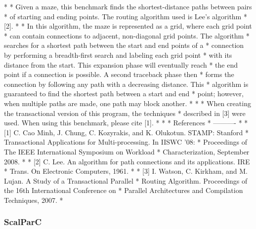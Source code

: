 \documentclass{article}
\begin{document}
*
* Given a maze, this benchmark finds the shortest-distance paths between pairs 
* of starting and ending points. The routing algorithm used is Lee's algorithm 
* [2].
* 
* In this algorithm, the maze is represented as a grid, where each grid point 
* can contain connections to adjacent, non-diagonal grid points. The algorithm
* searches for a shortest path between the start and end points of a 
* connection by performing a breadth-first search and labeling each grid point 
* with its distance from the start. This expansion phase will eventually reach 
* the end point if a connection is possible. A second traceback phase then 
* forms the connection by following any path with a decreasing distance. This 
* algorithm is guaranteed to find the shortest path  between a start and end 
* point; however, when multiple paths are made, one path may block another.
*
*
* When creating the transactional version of this program, the techniques
* described in [3] were used. When using this benchmark, please cite [1].
*
*
* References
* ----------
*
* [1] C. Cao Minh, J. Chung, C. Kozyrakis, and K. Olukotun. STAMP: Stanford 
*     Transactional Applications for Multi-processing. In IISWC '08: 
*     Proceedings of The IEEE International Symposium on Workload 
*     Characterization, September 2008. 
*
* [2] C. Lee. An algorithm for path connections and its applications. IRE 
*     Trans. On Electronic Computers, 1961.
*
* [3] I. Watson, C. Kirkham, and M. Lujan. A Study of a Transactional Parallel
*     Routing Algorithm. Proceedings of the 16th International Conference on
*     Parallel Architectures and Compilation Techniques, 2007.
*	

\subsubsection{ScalParC}


\end{document}
